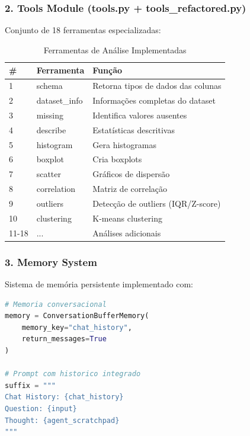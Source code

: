 \documentclass[12pt,a4paper]{article}
\begin{document}
\subsubsection{2. Tools Module (tools.py + tools\_refactored.py)}

Conjunto de 18 ferramentas especializadas:

\begin{table}[h]
\centering
\begin{tabular}{|l|l|p{5cm}|}
\hline
\textbf{\#} & \textbf{Ferramenta} & \textbf{Função} \\ \hline
1 & schema & Retorna tipos de dados das colunas \\ \hline
2 & dataset\_info & Informações completas do dataset \\ \hline
3 & missing & Identifica valores ausentes \\ \hline
4 & describe & Estatísticas descritivas \\ \hline
5 & histogram & Gera histogramas \\ \hline
6 & boxplot & Cria boxplots \\ \hline
7 & scatter & Gráficos de dispersão \\ \hline
8 & correlation & Matriz de correlação \\ \hline
9 & outliers & Detecção de outliers (IQR/Z-score) \\ \hline
10 & clustering & K-means clustering \\ \hline
11-18 & ... & Análises adicionais \\ \hline
\end{tabular}
\caption{Ferramentas de Análise Implementadas}
\end{table}

\newpage
\subsubsection{3. Memory System}

Sistema de memória persistente implementado com:

\begin{lstlisting}[language=Python, caption=Sistema de Memória]
# Memoria conversacional
memory = ConversationBufferMemory(
    memory_key="chat_history",
    return_messages=True
)

# Prompt com historico integrado
suffix = """
Chat History: {chat_history}
Question: {input}
Thought: {agent_scratchpad}
"""
\end{lstlisting}
\end{document}
